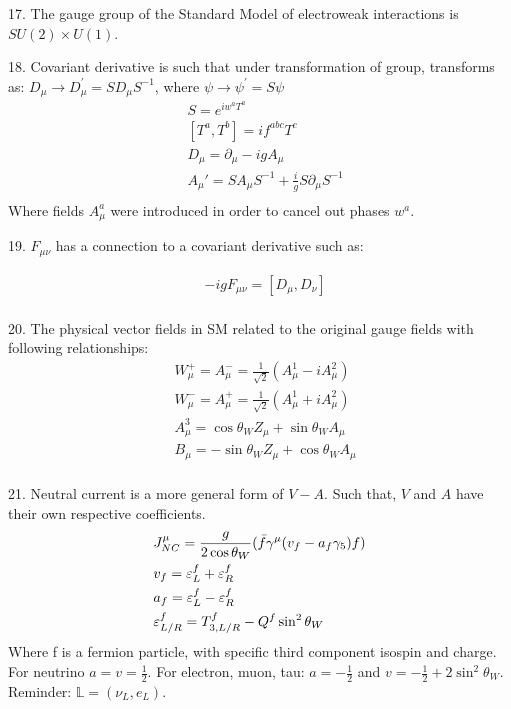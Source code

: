 17. The gauge group of the Standard Model of electroweak interactions is $SU(2)\times U(1)$.

18. Covariant derivative is such that under transformation of group, transforms as: $D_\mu\rightarrow D_\mu^{'} = S D_\mu S^{-1}$, where $\psi\rightarrow \psi^{'}=S\psi$
\begin{equation}
\begin{split}
&S=e^{i w^a T^a}\\
&[T^a,T^b]=if^{abc}T^c\\
&D_\mu = \partial_\mu - i g A_\mu\\
&A_\mu'= SA_\mu S^{-1}+\frac{i}{g} S\partial _\mu S^{-1}\\
\end{split}
\end{equation}
Where fields $A_\mu^a$ were introduced in order to cancel out phases $w^a$.

19. $F_{\mu\nu}$ has a connection to a covariant derivative such as:

\begin{equation}
\begin{split}
&-igF_{\mu\nu}=[D_\mu,D_\nu]\\
\end{split}
\end{equation}

20. The physical vector fields in SM related to the original gauge fields with following relationships:
\begin{equation}
\begin{split}
&W^+_\mu=A^-_\mu = \frac{1}{\sqrt{2}}(A_\mu^1 - i A_\mu^2) \\
&W^-_\mu=A^+_\mu = \frac{1}{\sqrt{2}}(A_\mu^1 + i A_\mu^2) \\
&A^3_\mu = \cos \theta _W Z_\mu +\sin \theta_W A_\mu\\
&B_\mu = -\sin \theta _W Z_\mu +\cos \theta_W A_\mu\\
\end{split}
\end{equation}

21. Neutral current is a more general form of $V-A$. Such that, $V$ and $A$ have their own respective coefficients. 
\begin{equation}
\begin{split}
&J_{NC}^\mu = \frac{g}{2\cos\theta_W}(\Bar{f} \gamma^\mu (v_f-a_f\gamma_5)f)\\
&v_f= \varepsilon_L^f + \varepsilon_R^f\\
&a_f= \varepsilon_L^f - \varepsilon_R^f\\
&\varepsilon_{L/R}^f=T_{3,L/R}^f -Q^f \sin^2 \theta_W\\
\end{split}
\end{equation}
Where f is a fermion particle, with specific third component isospin and charge. For neutrino $a=v=\frac{1}{2}$. For electron, muon, tau: $a=-\frac{1}{2}$ and $v=-\frac{1}{2}+2\sin^2 \theta_W$. Reminder: $\mathbb{L}=(\nu_L,e_L)$.

